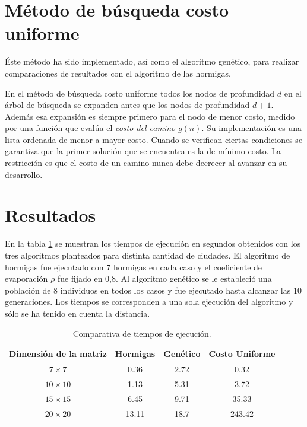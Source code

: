 \documentclass[conference,a4paper,10pt,oneside,final]{tfmpd}
\begin{document}
\section{Método de búsqueda costo uniforme}

Éste método ha sido implementado, así como el algoritmo genético, para realizar comparaciones de resultados con el algoritmo de las hormigas.

En el método de búsqueda costo uniforme todos los nodos de profundidad $d$ en el árbol de búsqueda se expanden antes que los nodos de profundidad $d+1$. Además esa expansión es siempre primero para el nodo de menor costo, medido por una función que evalúa el \textit{costo del camino} $g(n)$. Su implementación es una lista ordenada de menor a mayor costo. Cuando se verifican ciertas condiciones se garantiza que la primer solución que se encuentra es la de mínimo costo. La restricción es que el costo de un camino nunca debe decrecer al avanzar en su desarrollo.

\section{Resultados}

En la tabla \ref{table:tab1} se muestran los tiempos de ejecución en segundos obtenidos con los tres algoritmos planteados para distinta cantidad de ciudades. El algoritmo de hormigas fue ejecutado con 7 hormigas en cada caso y el coeficiente de evaporación $\rho$ fue fijado en 0,8. Al algoritmo genético se le estableció una población de 8 individuos en todos los casos y fue ejecutado hasta alcanzar las 10 generaciones. Los tiempos se corresponden a una sola ejecución del algoritmo y sólo se ha tenido en cuenta la distancia.

\begin{table}[!h]
\begin{center}
\begin{tabular}[c]{cccc} \toprule
Dimensión de la matriz & Hormigas & Genético & Costo Uniforme \\ \midrule
$7\times7$    & 0.36  & 2.72 & 0.32     \\
$10\times10$  & 1.13  & 5.31 & 3.72     \\
$15\times15$  & 6.45  & 9.71 & 35.33    \\
$20\times20$  & 13.11 & 18.7 & 243.42   \\ \bottomrule    
\end{tabular}
\end{center}
\caption{Comparativa de tiempos de ejecución.}
\label{table:tab1}
\end{table}
\end{document}
